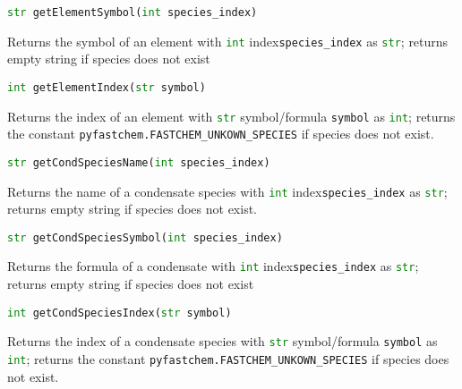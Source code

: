 \documentclass[numbers=noenddot]{aux/fcmanual}
\begin{document}
\bigbreak

\lstinline[language=Python]!str getElementSymbol(int species_index)!
\begin{addmargin}[25pt]{0pt}
	Returns the symbol of an element with \lstinline[language=Python]!int! index\footnotemark[\value{footnote}] \lstinline!species_index! as \lstinline[language=Python]!str!; returns empty string if species does not exist
\end{addmargin}

\bigbreak

\lstinline[language=Python]!int getElementIndex(str symbol)!
\begin{addmargin}[25pt]{0pt}
	Returns the index of an element with \lstinline[language=Python]!str! symbol/formula \lstinline!symbol! as \lstinline[language=Python]!int!; returns the constant \lstinline!pyfastchem.FASTCHEM_UNKOWN_SPECIES! if species does not exist.
\end{addmargin}

\bigbreak

\lstinline[language=Python]!str getCondSpeciesName(int species_index)!
\begin{addmargin}[25pt]{0pt}
	Returns the name of a condensate species with \lstinline[language=Python]!int! index\footnotemark[\value{footnote}] \lstinline!species_index! as \lstinline[language=Python]!str!; returns empty string if species does not exist.
\end{addmargin}  

\bigbreak

\lstinline[language=Python]!str getCondSpeciesSymbol(int species_index)!
\begin{addmargin}[25pt]{0pt}
	Returns the formula of a condensate with \lstinline[language=Python]!int! index\footnotemark[\value{footnote}] \lstinline!species_index! as \lstinline[language=Python]!str!; returns empty string if species does not exist
\end{addmargin}

\bigbreak

\lstinline[language=Python]!int getCondSpeciesIndex(str symbol)!
\begin{addmargin}[25pt]{0pt}
	Returns the index of a condensate species with \lstinline[language=Python]!str! symbol/formula \lstinline!symbol! as \lstinline[language=Python]!int!; returns the constant \lstinline!pyfastchem.FASTCHEM_UNKOWN_SPECIES! if species does not exist.
\end{addmargin}

\bigbreak
\end{document}
